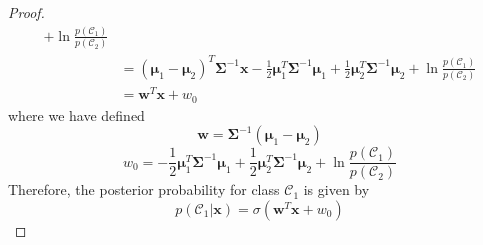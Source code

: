 \begin{proof}
\begin{align*}
        + \ln \frac{p(\mathcal{C}_1)}{p(\mathcal{C}_2)}\\
        &= (\bm{\mu}_1 - \bm{\mu}_2)^T \mathbf{\Sigma}^{-1} \mathbf{x}
        - \frac{1}{2} \bm{\mu}_1^T\mathbf{\Sigma}^{-1}\bm{\mu}_1
        + \frac{1}{2} \bm{\mu}_2^T\mathbf{\Sigma}^{-1}\bm{\mu}_2
        + \ln \frac{p(\mathcal{C}_1)}{p(\mathcal{C}_2)}\\
        &= \mathbf{w}^T\mathbf{x} + w_0
    \end{align*}
    where we have defined 
    \begin{equation}\label{eq:4.66}\tag{4.66}
        \mathbf{w} = \mathbf{\Sigma}^{-1}(\bm{\mu}_1 - \bm{\mu}_2)
    \end{equation}
    \vspace{-1em}
    \begin{equation}\label{eq:4.67}\tag{4.67}
        w_0 = 
        - \frac{1}{2} \bm{\mu}_1^T\mathbf{\Sigma}^{-1}\bm{\mu}_1
        + \frac{1}{2} \bm{\mu}_2^T\mathbf{\Sigma}^{-1}\bm{\mu}_2
        + \ln \frac{p(\mathcal{C}_1)}{p(\mathcal{C}_2)}
    \end{equation}
    Therefore, the posterior probability for class $\mathcal{C}_1$ 
    is given by
    \begin{equation}\label{eq:4.65}\tag{4.65}
        p(\mathcal{C}_1 | \mathbf{x}) = \sigma(\mathbf{w}^T\mathbf{x} + w_0)
    \end{equation}
\end{proof}
